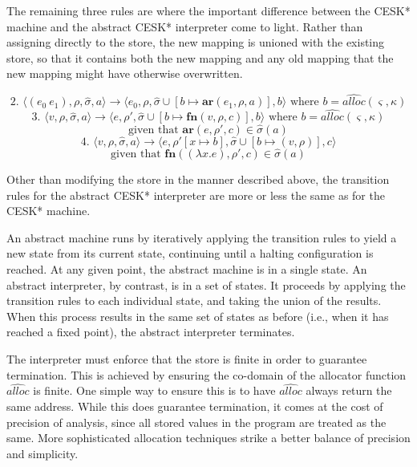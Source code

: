 \documentclass{article}
\begin{document}
The remaining three rules are where the important difference between the CESK* machine and the abstract CESK* interpreter come to light. Rather than assigning directly to the store, the new mapping is unioned with the existing store, so that it contains both the new mapping and any old mapping that the new mapping might have otherwise overwritten.

$$
\text{2. }
\langle (e_0\ e_1), \rho, \hat{\sigma}, a \rangle
\to
\langle e_0, \rho, \hat{\sigma} \cup [b \mapsto \textbf{ar}(e_1, \rho, a)], b \rangle
\text{ where $b = \widehat{alloc}(\varsigma, \kappa)$}
$$
$$
\text{3. }
\langle v, \rho, \hat{\sigma}, a \rangle
\to
\langle e, \rho', \hat{\sigma} \cup [b \mapsto \textbf{fn}(v, \rho, c)], b \rangle
\text{ where $b = \widehat{alloc}(\varsigma, \kappa)$}
$$
$$
\text{given that } \textbf{ar}(e, \rho', c) \in \hat{\sigma}(a)
$$
$$
\text{4. }
\langle v, \rho, \hat{\sigma}, a \rangle
\to
\langle e, \rho'[x \mapsto b], \hat{\sigma} \cup [b \mapsto (v, \rho)], c \rangle
$$
$$
\text{given that } \textbf{fn}((\lambda x.e), \rho', c) \in \hat{\sigma}(a)
$$

Other than modifying the store in the manner described above, the transition rules for the abstract CESK* interpreter are more or less the same as for the CESK* machine.

An abstract machine runs by iteratively applying the transition rules to yield a new state from its current state, continuing until a halting configuration is reached. At any given point, the abstract machine is in a single state. An abstract interpreter, by contrast, is in a set of states. It proceeds by applying the transition rules to each individual state, and taking the union of the results. When this process results in the same set of states as before (i.e., when it has reached a fixed point), the abstract interpreter terminates.

The interpreter must enforce that the store is finite in order to guarantee termination. This is achieved by ensuring the co-domain of the allocator function $\widehat{alloc}$ is finite. One simple way to ensure this is to have $\widehat{alloc}$ always return the same address. While this does guarantee termination, it comes at the cost of precision of analysis, since all stored values in the program are treated as the same. More sophisticated allocation techniques strike a better balance of precision and simplicity.
\end{document}
